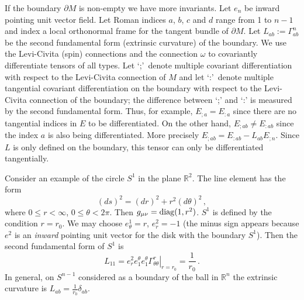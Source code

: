 If the boundary $\partial M$ is non-empty we have more invariants.
Let $e_n$ be inward pointing unit vector field. Let Roman indices $a$, $b$,
$c$ and $d$ range from 1 to $n-1$ and index a local orthonormal frame
for the tangent bundle of $\partial M$. Let $L_{ab}:=\Gamma^n_{ab}$
be the second fundamental form (extrinsic curvature) of the boundary.
We use the Levi-Civita (spin) connections and
the connection $\omega$ to covariantly differentiate tensors of all types. Let
\lq ;\rq\ denote multiple covariant differentiation with respect to 
the Levi-Civita connection of $M$ and let
\lq:\rq\ denote multiple tangential covariant differentiation 
on the boundary with respect to the
Levi-Civita connection of the boundary; the difference
 between `;' and `:' is measured by the second
fundamental form. Thus, for example, $E_{;a}=E_{:a}$ since 
there are no tangential indices in $E$ to be
differentiated. On the other hand, 
$E_{;ab}\ne E_{:ab}$ since the index $a$ is also being
differentiated. More precisely $E_{;ab}=E_{:ab}-L_{ab}E_{;n}$.
Since $L$ is only defined on the boundary, this
tensor can only be differentiated tangentially.

Consider an example of the circle $S^1$ in the plane $\mathbb{R}^2$.
The line element has the form
\begin{equation}
(ds)^2 = (dr)^2 +r^2 (d\theta)^2 \,,\label{lineS2}
\end{equation}
where $0\le r<\infty$, $0\le \theta <2\pi$. Then $g_{\mu\nu}=
{\rm diag} (1,r^2)$. $S^1$ is defined by the condition $r=r_0$.
We may choose $e_\theta^1=r$, $e_r^2=-1$
(the minus sign appears because $e^2$ is an {\it inward}
pointing unit vector for the disk with the boundary $S^1$).
Then the second fundamental form of $S^1$ is
\begin{equation}
L_{11}=\left.
e_r^2 e_1^\theta e_1^\theta \Gamma_{\theta\theta}^r\right|_{r=r_0}=
\frac 1{r_0} \,.\label{LonS1}
\end{equation}
In general, on $S^{n-1}$ considered as a boundary of the ball in
$\mathbb{R}^n$ the extrinsic curvature is $L_{ab}=\frac 1{r_0} \delta_{ab}$.


